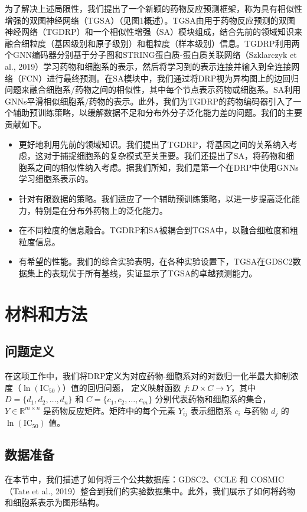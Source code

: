 为了解决上述局限性，我们提出了一个新颖的药物反应预测框架，称为具有相似性增强的双图神经网络（TGSA）（见图1概述）。TGSA由用于药物反应预测的双图神经网络（TGDRP）和一个相似性增强（SA）模块组成，结合先前的领域知识来融合细粒度（基因级别和原子级别）和粗粒度（样本级别）信息。TGDRP利用两个GNN编码器分别基于分子图和STRING蛋白质-蛋白质关联网络（Szklarczyk et al., 2019）学习药物和细胞系的表示，然后将学习到的表示连接并输入到全连接网络（FCN）进行最终预测。在SA模块中，我们通过将DRP视为异构图上的边回归问题来融合细胞系/药物之间的相似性，其中每个节点表示药物或细胞系。SA利用GNNs平滑相似细胞系/药物的表示。此外，我们为TGDRP的药物编码器引入了一个辅助预训练策略，以缓解数据不足和分布外分子泛化能力差的问题。我们的主要贡献如下。
\begin{itemize}
    \item 更好地利用先前的领域知识。我们提出了TGDRP，将基因之间的关系纳入考虑，这对于捕捉细胞系的复杂模式至关重要。我们还提出了SA，将药物和细胞系之间的相似性纳入考虑。据我们所知，我们是第一个在DRP中使用GNNs学习细胞系表示的。
    \item 针对有限数据的策略。我们适应了一个辅助预训练策略，以进一步提高泛化能力，特别是在分布外药物上的泛化能力。
    \item 在不同粒度的信息融合。TGDRP和SA被耦合到TGSA中，以融合细粒度和粗粒度信息。
    \item 有希望的性能。我们的综合实验表明，在各种实验设置下，TGSA在GDSC2数据集上的表现优于所有基线，实证显示了TGSA的卓越预测能力。
\end{itemize}
\section{材料和方法}
\subsection{问题定义}
在这项工作中，我们将DRP定义为对应药物-细胞系对的对数归一化半最大抑制浓度（$\ln(\text{IC}_{50})$）值的回归问题，
定义映射函数 $ f: D \times C \rightarrow Y $，其中 $D = \{d_1, d_2, \ldots, d_n\}$ 和 $C = \{c_1, c_2, \ldots, c_m\}$ 分别代表药物和细胞系的集合，$Y \in \mathbb{R}^{m \times n}$ 是药物反应矩阵。矩阵中的每个元素 $Y_{ij}$ 表示细胞系 $c_i$ 与药物 $d_j$ 的 $\ln(\text{IC}_{50})$ 值。

\subsection{数据准备}
在本节中，我们描述了如何将三个公共数据库：GDSC2、CCLE 和 COSMIC（Tate et al., 2019）整合到我们的实验数据集中。此外，我们展示了如何将药物和细胞系表示为图形结构。

